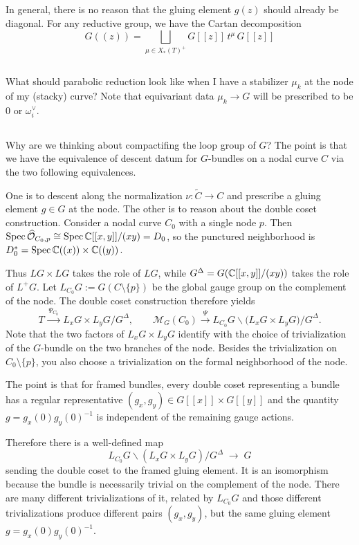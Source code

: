 \documentclass[12pt]{article}
\begin{document}
In general, there is no reason that the gluing element $g(z)$ should already be diagonal. For any reductive group, we have the Cartan decomposition
\[
G((z))
=
\bigsqcup_{\mu\in X_*(T)^+}
G[[z]]\, t^\mu\, G[[z]]\]


\subsection{}
What should parabolic reduction look like when I have a stabilizer $\mu_k$ at the node of my (stacky) curve? Note that equivariant data $\mu_k \to G$ will be prescribed to be $0$ or $\omega_i^\vee$.

\subsection{}
Why are we thinking about compactifing the loop group of $G$? The point is that we have the equivalence of descent datum for $G$-bundles on a nodal curve $C$ via the two following equivalences.

One is to descent along the normalization $\nu:\tilde{C}\to C$ and prescribe a gluing element $g\in G$ at the node. The other is to reason about the double coset construction.
Consider a nodal curve $C_0$ with a single node $p$. Then $\operatorname{Spec} \widehat{\mathcal O}_{C_0,p} \cong \operatorname{Spec} \mathbb{C}[[x,y]]/(xy) = D_0$, so the punctured neighborhood is $D_0^\ast = \operatorname{Spec} \mathbb{C}((x)) \times \mathbb{C}((y))$.


Thus $LG \times LG$ takes the role of $LG$, while $G^\Delta = G(\mathbb{C}[[x,y]]/(xy))$ takes the role of $L^+G$. Let $L_{C_0}G := G(C\setminus\{p\})$ be the global gauge group on the complement of the node. The double coset construction therefore yields
\[
T \xrightarrow{\;\Psi_{C_0}\;} L_x G \times L_y G / G^\Delta, \qquad
\mathcal M_G(C_0) \xrightarrow{\;\Psi\;} L_{C_0}G \backslash \bigl(L_x G \times L_y G\bigr)/G^\Delta .
\]
Note that the two factors of $L_x G \times L_y G$ identify with the choice of trivialization of the $G$-bundle on the two branches of the node. Besides the trivialization on $C_0\setminus\{p\}$, you also choose a trivialization on the formal neighborhood of the node.

The point is that for framed bundles, every double coset representing a bundle has a regular representative
$(g_x,g_y)\in G[[x]]\times G[[y]]$ and the quantity
$g=g_x(0)g_y(0)^{-1}$ is independent of the remaining gauge actions.

Therefore there is a well-defined map
\[L_{C_0}G\backslash (L_xG\times L_yG)/G^\Delta
\;\longrightarrow\;
G\]
sending the double coset to the framed gluing element. It is an isomorphism because the bundle is necessarily trivial on the complement of the node. There are many different trivializations of it, related by $L_{C_0}G$ and those different trivializations produce different pairs $(g_x,g_y)$, but the same gluing element $g=g_x(0)g_y(0)^{-1}$.
\end{document}
